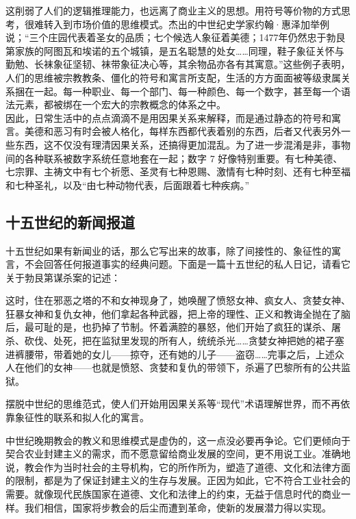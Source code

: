 \begin{enumerate}
    这削弱了人们的逻辑推理能力，也远离了商业主义的思想。用符号等价物的方式思考，很难转入到市场价值的思维模式。杰出的中世纪史学家约翰·惠泽加举例说；“三个庄园代表着圣女的品质；七个候选人象征着美德；1477年仍然忠于勃艮第家族的阿图瓦和埃诺的五个城镇，是五名聪慧的处女……同理，鞋子象征关怀与勤勉、长袜象征坚韧、袜带象征决心等，其余物品亦各有其寓意。”这些例子表明，人们的思维被宗教教条、僵化的符号和寓言所支配，生活的方方面面被等级隶属关系捆在一起。每一种职业、每一个部门、每一种颜色、每一个数字，甚至每一个语法元素，都被绑在一个宏大的宗教概念的体系之中。\\ 
    
    因此，日常生活中的点点滴滴不是用因果关系来解释，而是通过静态的符号和寓言。美德和恶习有时会被人格化，每样东西都代表着别的东西，后者又代表另外一些东西，这不仅没有理清因果关系，还搞得更加混乱。为了进一步混淆是非，事物间的各种联系被数字系统任意地套在一起；数字 7 好像特别重要。有七种美德、七宗罪、主祷文中有七个祈愿、圣灵有七种恩赐、激情有七种时刻、还有七种至福和七种圣礼，以及“由七种动物代表，后面跟着七种疾病。”
\end{enumerate}

\subsection{十五世纪的新闻报道}

十五世纪如果有新闻业的话，那么它写出来的故事，除了间接性的、象征性的寓言，不会回答任何报道事实的经典问题。下面是一篇十五世纪的私人日记，请看它关于勃艮第谋杀案的记述：


\begin{tcolorbox}
\kaishu 这时，住在邪恶之塔的不和女神现身了，她唤醒了愤怒女神、疯女人、贪婪女神、狂暴女神和复仇女神，他们拿起各种武器，把上帝的理性、正义和教诲全抛在了脑后，最可耻的是，也扔掉了节制。怀着满腔的暴怒，他们开始了疯狂的谋杀、屠杀、砍伐、处死，把在监狱里发现的所有人，统统杀光……贪婪女神把她的裙子塞进裤腰带，带着她的女儿——掠夺，还有她的儿子——盗窃……完事之后，上述众人在他们的女神——也就是愤怒、贪婪和复仇的带领下，杀遍了巴黎所有的公共监狱。
\end{tcolorbox}

摆脱中世纪的思维范式，使人们开始用因果关系等“现代”术语理解世界，而不再依靠象征性的联系和拟人化的寓言。

中世纪晚期教会的教义和思维模式是虚伪的，这一点没必要再争论。它们更倾向于契合农业封建主义的需求，而不愿意留给商业发展的空间，更不用说工业。准确地说，教会作为当时社会的主导机构，它的所作所为，塑造了道德、文化和法律方面的限制，都是为了保证封建主义的生存与发展。正因为如此，它不符合工业社会的需要。就像现代民族国家在道德、文化和法律上的约束，无益于信息时代的商业一样。我们相信，国家将步教会的后尘而遭到革命，使新的发展潜力得以实现。

